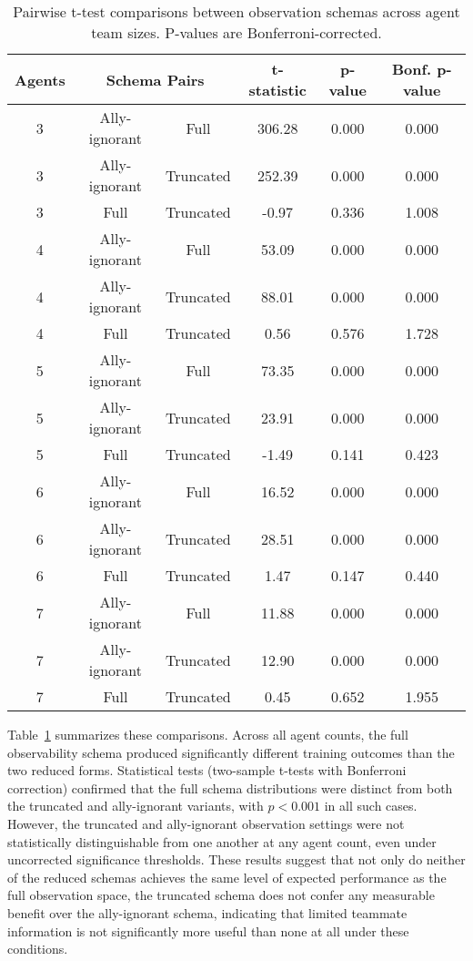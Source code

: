 \documentclass{article}
\begin{document}
\begin{table}[!ht]
    \centering
    \caption{Pairwise t-test comparisons between observation schemas across agent team sizes. P-values are Bonferroni-corrected.}
    \label{tab:observation_comparisons}
    \begin{tabular}{cccccc}
    \toprule
    \textbf{Agents} & \multicolumn{2}{c}{\textbf{Schema Pairs}} & \textbf{t-statistic} & \textbf{p-value} & \textbf{Bonf. p-value} \\
    \midrule
    3 & Ally-ignorant & Full            & 306.28  & 0.000 & 0.000 \\
    3 & Ally-ignorant & Truncated       & 252.39  & 0.000 & 0.000 \\
    3 & Full          & Truncated       & -0.97   & 0.336 & 1.008 \\
    4 & Ally-ignorant & Full            & 53.09   & 0.000 & 0.000 \\
    4 & Ally-ignorant & Truncated       & 88.01   & 0.000 & 0.000 \\
    4 & Full          & Truncated       & 0.56    & 0.576 & 1.728 \\
    5 & Ally-ignorant & Full            & 73.35   & 0.000 & 0.000 \\
    5 & Ally-ignorant & Truncated       & 23.91   & 0.000 & 0.000 \\
    5 & Full          & Truncated       & -1.49   & 0.141 & 0.423 \\
    6 & Ally-ignorant & Full            & 16.52   & 0.000 & 0.000 \\
    6 & Ally-ignorant & Truncated       & 28.51   & 0.000 & 0.000 \\
    6 & Full          & Truncated       & 1.47    & 0.147 & 0.440 \\
    7 & Ally-ignorant & Full            & 11.88   & 0.000 & 0.000 \\
    7 & Ally-ignorant & Truncated       & 12.90   & 0.000 & 0.000 \\
    7 & Full          & Truncated       & 0.45    & 0.652 & 1.955 \\
    \bottomrule
    \end{tabular}
\end{table}

Table~\ref{tab:observation_comparisons} summarizes these comparisons. Across all agent counts, 
the full observability schema produced significantly different training outcomes 
than the two reduced forms. Statistical tests (two-sample t-tests with Bonferroni correction) 
confirmed that the full schema distributions were distinct from both the 
truncated and ally-ignorant variants, with $p < 0.001$ in all such cases. 
However, the truncated and ally-ignorant observation settings were not 
statistically distinguishable from one another at any agent count, 
even under uncorrected significance thresholds. 
These results suggest that not only do neither of the reduced schemas 
achieves the same level of expected performance as the full observation space, 
the truncated schema does not confer any measurable benefit over 
the ally-ignorant schema, indicating that limited teammate information is not 
significantly more useful than none at all under these conditions.
\end{document}
